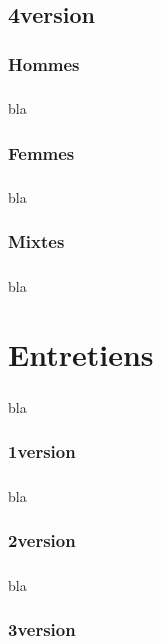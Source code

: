 \section{4\ieme version}
\subsection{Hommes}
\paragraph{}
bla

\subsection{Femmes}
\paragraph{}
bla

\subsection{Mixtes}
\paragraph{}
bla

\chapter{Entretiens}
\paragraph{}
bla

\subsection{1\ier version}
\paragraph{}
bla

\subsection{2\ieme version}
\paragraph{}
bla

\subsection{3\ieme version}
